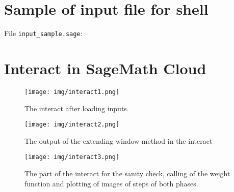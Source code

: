     


\newpage
\section{Sample of input file for shell}
File \verb+input_sample.sage+:
\label{app:inputSample}



\section{Interact in SageMath Cloud}
\label{app:interact}
\begin{figure}[!htbp]
  \centering
  \texttt{[image: img/interact1.png]}
  \caption{The interact after loading inputs.}
  \label{fig:interact1}
\end{figure}

\begin{figure}[htbp]
  \centering
  \texttt{[image: img/interact2.png]}
  \caption{The output of the extending window method in the interact}
  \label{fig:interact2}
\end{figure}

\begin{figure}[htbp]
  \centering
  \texttt{[image: img/interact3.png]}
  \caption{The part of the interact for the sanity check, calling of the weight function and plotting of images of steps of both phases.}
  \label{fig:interact3}
\end{figure}